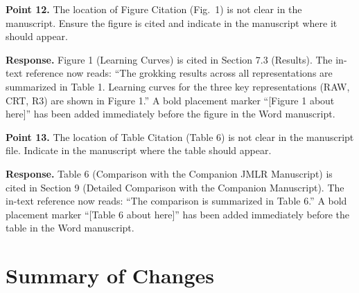 \documentclass[11pt,a4paper]{article}
\begin{document}
\bigskip

\textbf{Point 12.} The location of Figure Citation (Fig.~1) is not clear in the manuscript. Ensure the figure is cited and indicate in the manuscript where it should appear.

\textbf{Response.} Figure 1 (Learning Curves) is cited in Section 7.3 (Results). The in-text reference now reads: ``The grokking results across all representations are summarized in Table 1. Learning curves for the three key representations (RAW, CRT, R3) are shown in Figure 1.'' A bold placement marker ``[Figure 1 about here]'' has been added immediately before the figure in the Word manuscript.

\bigskip

\textbf{Point 13.} The location of Table Citation (Table 6) is not clear in the manuscript file. Indicate in the manuscript where the table should appear.

\textbf{Response.} Table 6 (Comparison with the Companion JMLR Manuscript) is cited in Section 9 (Detailed Comparison with the Companion Manuscript). The in-text reference now reads: ``The comparison is summarized in Table 6.'' A bold placement marker ``[Table 6 about here]'' has been added immediately before the table in the Word manuscript.

\bigskip

\section*{Summary of Changes}
\end{document}
